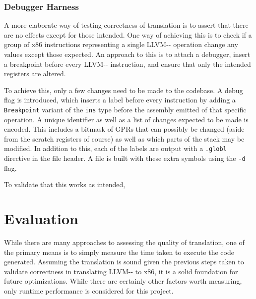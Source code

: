 \documentclass{article}
\begin{document}

\subsubsection{Debugger Harness}
A more elaborate way of testing correctness of translation is to assert that there are no effects except for those intended. One way of achieving this is to check if a group of x86 instructions representing a single LLVM-{}- operation change any values except those expected. An approach to this is to attach a debugger, insert a breakpoint before every LLVM-{}- instruction, and ensure that only the intended registers are altered.

To achieve this, only a few changes need to be made to the codebase. A debug flag is introduced, which inserts a label before every instruction by adding a \lstinline!Breakpoint! variant of the \lstinline!ins! type before the assembly emitted of that specific operation. A unique identifier as well as a list of changes expected to be made is encoded. 
This includes a bitmask of GPRs that can possibly be changed (aside from the scratch registers of course) as well as which parts of the stack may be modified. %
In addition to this, each of the labels are output with a \lstinline!.globl! directive in the file header. A file is built with these extra symbols using the \lstinline!-d! flag.

To validate that this works as intended, 





\section{Evaluation}

While there are many approaches to assessing the quality of translation, one of the primary means is to simply measure the time taken to execute the code generated. 
Assuming the translation is sound given the previous steps taken to validate correctness in translating LLVM-{}- to x86, it is a solid foundation for future optimizations. While there are certainly other factors worth measuring, only runtime performance is considered for this project. %
\end{document}
